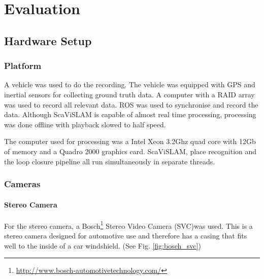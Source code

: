 \chapter{Evaluation}
\label{chapter:evaluation}


\section{Hardware Setup}

\subsection{Platform}

A vehicle was used to do the recording.  The vehicle was equipped with GPS and inertial sensors for collecting ground truth data.  A computer with a RAID array was used to record all relevant data.  ROS was used to synchronise and record the data.  Although ScaViSLAM is capable of almost real time processing, processing was done offline with playback slowed to half speed.

The computer used for processing was a Intel Xeon 3.2Ghz quad core with 12Gb of memory and a Quadro 2000 graphics card.  ScaViSLAM, place recognition and the loop closure pipeline all run simultaneously in separate threads.

\subsection{Cameras}

\subsubsection{Stereo Camera}

For the stereo camera, a Bosch\footnote{\url{http://www.bosch-automotivetechnology.com/}} Stereo Video Camera (SVC)was used.  This is a stereo camera designed for automotive use and therefore has a casing that fits well to the inside of a car windshield.  (See Fig. \ref{fig:bosch_svc})

